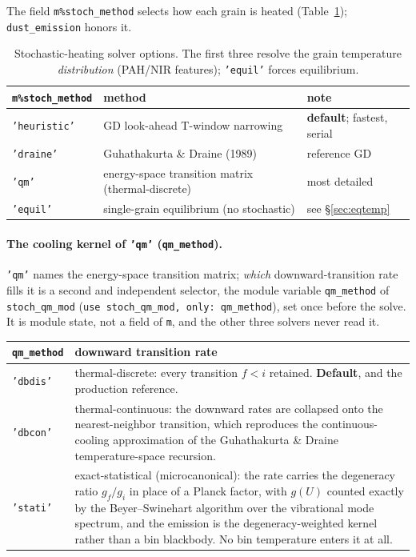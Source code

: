 \documentclass{my_memo}
\newcommand{\code}[1]{\texttt{#1}}
\begin{document}
The field \code{m\%stoch\_method} selects how each grain is heated
(Table~\ref{tab:solver}); \code{dust\_emission} honors it.

\begin{table}[h]
\centering
\begin{tabular}{@{}lll@{}}
\toprule
\code{m\%stoch\_method} & method & note \\
\midrule
\code{'heuristic'} & GD look-ahead T-window narrowing & \textbf{default}; fastest, serial \\
\code{'draine'}    & Guhathakurta \& Draine (1989) & reference GD \\
\code{'qm'}        & energy-space transition matrix (thermal-discrete) & most detailed \\
\code{'equil'}     & single-grain equilibrium (no stochastic) & see \S\ref{sec:eqtemp} \\
\bottomrule
\end{tabular}
\caption{Stochastic-heating solver options. The first three resolve the grain
temperature \emph{distribution} (PAH/NIR features); \code{'equil'} forces
equilibrium.}
\label{tab:solver}
\end{table}

\paragraph{The cooling kernel of \code{'qm'} (\code{qm\_method}).}
\code{'qm'} names the energy-space transition matrix; \emph{which}
downward-transition rate fills it is a second and independent selector, the
module variable \code{qm\_method} of \code{stoch\_qm\_mod}
(\code{use stoch\_qm\_mod, only: qm\_method}), set once before the solve. It is
module state, not a field of \code{m}, and the other three solvers never read
it.

\begin{center}
\begin{tabular}{@{}lL{0.68\textwidth}@{}}
\toprule
\code{qm\_method} & downward transition rate \\
\midrule
\code{'dbdis'} & thermal-discrete: every transition $f < i$ retained.
  \textbf{Default}, and the production reference. \\
\code{'dbcon'} & thermal-continuous: the downward rates are collapsed onto the
  nearest-neighbor transition, which reproduces the continuous-cooling
  approximation of the Guhathakurta \& Draine temperature-space recursion. \\
\code{'stati'} & exact-statistical (microcanonical): the rate carries the
  degeneracy ratio $g_f/g_i$ in place of a Planck factor, with $g(U)$ counted
  exactly by the Beyer--Swinehart algorithm over the vibrational mode spectrum,
  and the emission is the degeneracy-weighted kernel rather than a bin
  blackbody. No bin temperature enters it at all. \\
\bottomrule
\end{tabular}
\end{center}
\end{document}
